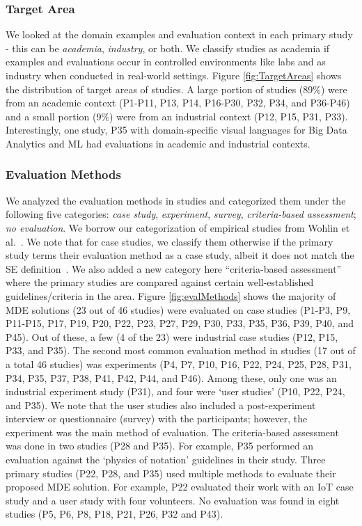 \subsubsection{Target Area} 
We looked at the domain examples and evaluation context in each primary study - this can be \textit{academia}, \textit{industry}, or both. We classify studies as academia if examples and evaluations occur in controlled environments like labs and as industry when conducted in real-world settings. Figure \ref{fig:TargetAreas} shows the distribution of target areas of studies. A large portion of studies (89\%) were from an academic context (P1-P11, P13, P14, P16-P30, P32, P34, and P36-P46) and a small portion (9\%) were from an industrial context (P12, P15, P31, P33). Interestingly, one study, P35 with domain-specific visual languages for Big Data Analytics and ML had evaluations in academic and industrial contexts. 

\subsubsection{Evaluation Methods} 
We analyzed the evaluation methods in studies and categorized them under the following five categories: \textit{case study}, \textit{experiment}, \textit{survey}, \textit{criteria-based assessment}; \textit{no evaluation}. 
We borrow our categorization of empirical studies from Wohlin et al.~\cite{wohlin2012experimentation}. We note that for case studies, we classify them otherwise if the primary study terms their evaluation method as a case study, albeit it does not match the SE definition~\cite{wohlin2012experimentation}. We also added a new category here ``criteria-based assessment'' where the primary studies are compared against certain well-established guidelines/criteria in the area.
%
Figure \ref{fig:evalMethods} shows the majority of MDE solutions (23 out of 46 studies) were evaluated on case studies (P1-P3, P9, P11-P15, P17, P19, P20, P22, P23, P27, P29, P30, P33, P35, P36, P39, P40, and P45). Out of these, a few (4 of the 23) were industrial case studies (P12, P15, P33, and P35). The second most common evaluation method in studies (17 out of a total 46 studies) was experiments (P4, P7, P10, P16, P22, P24, P25, P28, P31, P34, P35, P37, P38, P41, P42, P44, and P46). Among these, only one was an industrial experiment study (P31), and four were `user studies' (P10, P22, P24, and P35). We note that the user studies also included a post-experiment interview or questionnaire (survey) with the participants; however, the experiment was the main method of evaluation.
The criteria-based assessment was done in two studies (P28 and P35). For example, P35 performed an evaluation against the `physics of notation' guidelines in their study. 
Three primary studies (P22, P28, and P35) used multiple methods to evaluate their proposed MDE solution. For example, P22 evaluated their work with an IoT case study and a user study with four volunteers. No evaluation was found in eight studies (P5, P6, P8, P18, P21, P26, P32 and P43). 




